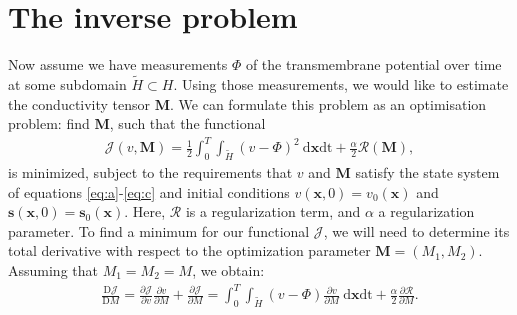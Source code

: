 \documentclass[12pt,a4paper]{article}
\begin{document}
\section{The inverse problem} \label{The inverse problem}
Now assume we have measurements $\Phi$ of the transmembrane potential over time at some subdomain $\tilde{H}\subset H$. Using those measurements, we would like to estimate the conductivity tensor $\mathbf{M}$. %
We can formulate this problem as an optimisation problem: find $\mathbf{M}$, such that the functional
\begin{eqnarray} 
\mathcal{J}(v, \mathbf{M})=
\frac{1}{2} \int_0^T \int_{\tilde{H}}(v-\Phi)^2 \: \text{d}\textbf{x} \text{dt} + \frac{\alpha}{2}\mathcal{R}(\mathbf{M}), \label{J}
\end{eqnarray}
is minimized, subject to the requirements that $v$ and $\mathbf{M}$ satisfy the state system of equations \eqref{eq:a}-\eqref{eq:c} and initial conditions $v(\textbf{x},0)=v_0(\textbf{x})$ and $\mathbf{s}(\mathbf{x},0)=\mathbf{s}_0(\mathbf{x})$. Here, $\mathcal{R}$ is a regularization term, and $\alpha$ a regularization parameter.
To find a minimum for our functional $\mathcal{J}$, we will need to determine its total derivative with respect to the optimization parameter $\mathbf{M}=(M_1,M_2)$. Assuming that $M_1=M_2=M$, we obtain:
\begin{eqnarray}
\frac{\text{D}\mathcal{J}}{\text{D}{M}}=\frac{\partial \mathcal{J}}{\partial v}\frac{\partial v}{\partial M}+\frac{\partial \mathcal{J}}{\partial M}
=\int_0^T\int_{\tilde{H}}(v-\Phi)\frac{\partial v}{\partial M} \: \text{d}\textbf{x}\text{dt}  + \frac{\alpha}{2}\frac{\partial\mathcal{R}}{\partial M}.
\end{eqnarray}
\end{document}
